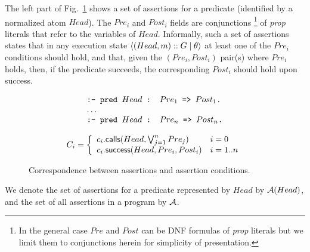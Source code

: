 \documentclass{llncs}
\newcommand{\finalcompression}[1]{\vspace*{#1}}
\begin{document}
The left part of Fig.~\ref{fig:asr-and-asrconds} shows a set of
assertions for a predicate (identified by a normalized atom $Head$).
%
The $Pre_i$ and $Post_i$ fields are conjunctions%
\footnote{In the general case $Pre$ and $Post$ can be DNF formulas of
  \emph{prop} literals but we limit them to conjunctions herein for
  simplicity of presentation.}  of \emph{prop} literals that refer to
the variables of $Head$.
%
Informally, such a set of assertions states that in any execution state
$\langle (Head,m) :: G \mid{} \theta \rangle$ at least one of the $Pre_i$ conditions
should hold, and that, given the $(Pre_i,Post_i)$ pair(s) where
$Pre_i$ holds, then, if the predicate succeeds, the corresponding
$Post_i$ should hold upon success.
%
\begin{figure}[t]
\begin{minipage}{0.45\textwidth}
\begin{small}
  \[
  \begin{array}{l}
    \kbd{:-}\kbd{ pred } Head \kbd{ : } Pre_1 \kbd{ => } Post_1 \kbd{.}
  \\
    \ldots
  \\
    \kbd{:-}\kbd{ pred } Head \kbd{ : } Pre_n \kbd{ => } Post_n \kbd{.}
  \end{array}
  \]
\end{small}
\end{minipage}
\begin{minipage}{0.45\textwidth}
\begin{small}
  \[
    C_i = \left\{
    \begin{array}{ll}
      c_i.\textsf{calls}(Head, \bigvee _{j = 1}^{n} Pre_j)
    & i = 0
    \\
      c_i.\textsf{success}(Head, Pre_i, Post_i)
    & i = 1..n
    \end{array}
    \right.
  \]
\end{small}
\end{minipage}
\finalcompression{-5mm}

%
\caption{Correspondence between assertions and assertion conditions.}
\label{fig:asr-and-asrconds}

\end{figure}
%
We denote the set of assertions
for a predicate represented by
$Head$
by ${\cal A}(Head)$, and the set of all assertions in a program by ${\cal A}$.
\end{document}
